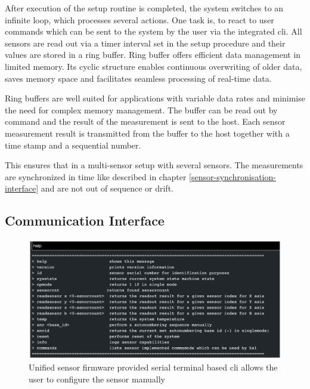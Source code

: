 After execution of the setup routine is completed, the system switches
to an infinite loop, which processes several actions. One task is, to
react to user commands which can be sent to the system by the user via
the integrated \gls{cli}. All sensors are read out via a timer interval
set in the setup procedure and their values are stored in a ring buffer.
Ring buffer offers efficient data management in limited memory. Its
cyclic structure enables continuous overwriting of older data, saves
memory space and facilitates seamless processing of real-time data.

Ring buffers are well suited for applications with variable data rates
and minimise the need for complex memory management. The buffer can be
read out by command and the result of the measurement is sent to the
host. Each sensor measurement result is transmitted from the buffer to
the host together with a time stamp and a sequential number.

This ensures that in a multi-sensor setup with several sensors. The
measurements are synchronized in time like described in chapter
\ref{sensor-synchronisation-interface} and are not out of sequence or
drift.

\hypertarget{communication-interface}{%
\subsection{Communication Interface}\label{communication-interface}}

\begin{figure}
\centering
\includegraphics{./generated_images/border_Unified_sensor_firmware_provided_serial_terminal_based_(+cli)_allows_the_user_to_configure_the_sensor_manually.png}
\caption{Unified sensor firmware provided serial terminal based
\gls{cli} allows the user to configure the sensor manually
\label{Unified_sensor_firmware_provided_serial_terminal_based_(+cli)_allows_the_user_to_configure_the_sensor_manually.png}}
\end{figure}


